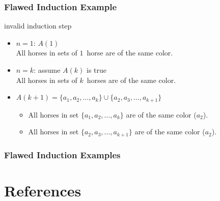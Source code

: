 \documentclass[dvipsnames]{beamer}
\begin{document}
\begin{frame}
  \frametitle{Flawed Induction Example}

  \begin{block}{invalid induction step}
    \begin{itemize}
      \item $n=1$: $A(1)$\\
        All horses in sets of $1$~horse are of the same color.

      \pause
      \medskip
      \item $n=k$: assume $A(k)$ is true\\
        All horses in sets of $k$~horses are of the same color.
      \pause
      \medskip
      \item $A(k+1)=\{a_1,a_2,\dots,a_k\} \cup \{a_2,a_3,\dots,a_{k+1}\}$
      \begin{itemize}
        \item All horses in set $\{a_1,a_2,\dots,a_k\}$
          are of the same color ($a_2$).
        \item All horses in set $\{a_2,a_3,\dots,a_{k+1}\}$
          are of the same color ($a_2$).
      \end{itemize}
    \end{itemize}
  \end{block}
\end{frame}

\begin{frame}
  \frametitle{Flawed Induction Examples}

  \begin{center}
  \end{center}
\end{frame}

\section*{References}
\end{document}
